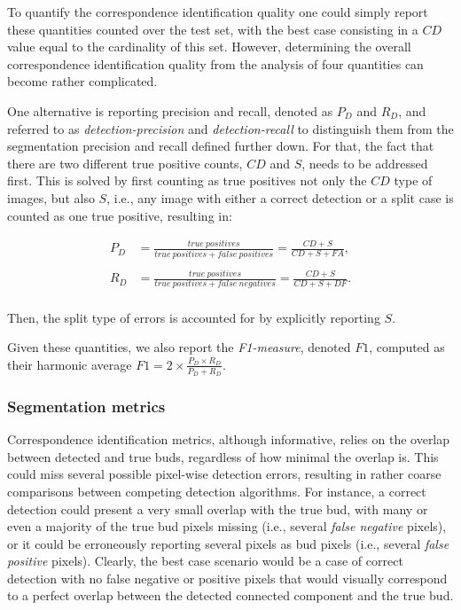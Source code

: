 \documentclass[a4paper,authoryear,review]{elsarticle}
\begin{document}
To quantify the correspondence identification quality one could simply report these quantities counted over the test set, with the best case consisting in a $CD$ value equal to the cardinality of this set. However, determining the overall correspondence identification quality from the analysis of four quantities can become rather complicated. 

One alternative is reporting precision and recall, denoted as $P_D$ and $R_D$, and referred to as \emph{detection-precision} and \emph{detection-recall} to distinguish them from the segmentation precision and recall defined further down. For that, the fact that there are two different true positive counts, $CD$ and $S$, needs to be addressed first. This is solved by first counting as true positives not only the $CD$ type of images, but also $S$, i.e., any image with either a correct detection or a split case is counted as one true positive, resulting in:

\begin{align*}
        P_D &= \frac{true\ positives}{true\ positives+false\ positives}
        = \frac{CD+S}{CD+S+FA} ,\\
        \\
        R_D &= \frac{true\ positives}{true\ positives+false\ negatives}
        = \frac{CD+S}{CD+S+DF} .\\
    \end{align*}

Then, the split type of errors is accounted for by explicitly reporting $S$. 

Given these quantities, we also report the \emph{F1-measure}, denoted $F1$, computed as their harmonic average $F1 = 2 \times \frac{P_D \times R_D}{P_D + R_D}$.

\subsubsection{Segmentation metrics}
\label{subsec:segmetrics}

Correspondence identification metrics, although informative, relies on the overlap between detected and true buds, regardless of how minimal the overlap is. This could miss several possible pixel-wise detection errors, resulting in rather coarse comparisons between competing detection algorithms. For instance, a correct detection could present a very small overlap with the true bud, with many or even a majority of the true bud pixels missing (i.e., several \emph{false negative} pixels), or it could be erroneously reporting several pixels as bud pixels (i.e., several \emph{false positive} pixels). Clearly, the best case scenario would be a case of correct detection with no false negative or positive pixels that would visually correspond to a perfect overlap between the detected connected component and the true bud. 
\end{document}
